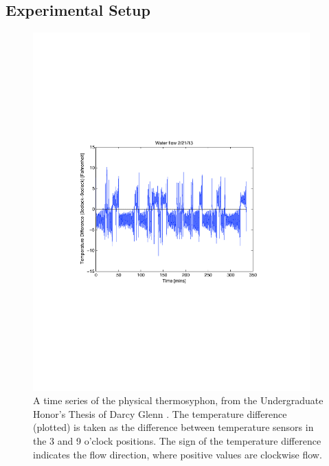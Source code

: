 \documentclass[12pt]{report}
\begin{document}
\subsection{Experimental Setup}

\begin{figure}[h!]
  \centering
  \includegraphics[width=0.95\textwidth]{figures/221TimeSeries.pdf}
  \caption[A time series of the physical thermosyphon, from the Undergraduate Honor's Thesis of Darcy Glenn {\protect {}}]{
    A time series of the physical thermosyphon, from the Undergraduate Honor's Thesis of Darcy Glenn {\protect {}}.
    The temperature difference (plotted) is taken as the difference between temperature sensors in the 3 and 9 o'clock positions.
    The sign of the temperature difference indicates the flow direction, where positive values are clockwise flow.
  }
  \label{fig:chrisLoop}
\end{figure}
\end{document}
